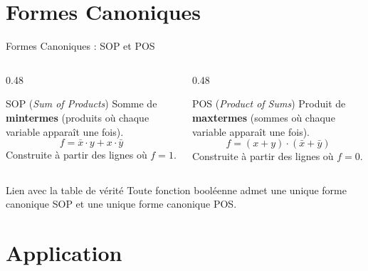 \section{Formes Canoniques}

\begin{frame}{Formes Canoniques : SOP et POS}

    \begin{columns}[T]
        \begin{column}{0.48\textwidth}
            \begin{block}{SOP (\textit{Sum of Products})}
                Somme de \textbf{mintermes} (produits où chaque variable apparaît une fois).
                \[
                    f = \bar{x} \cdot y + x \cdot \bar{y}
                \]
                Construite à partir des lignes où \(f = 1\).
            \end{block}
        \end{column}
        \begin{column}{0.48\textwidth}
            \begin{block}{POS (\textit{Product of Sums})}
                Produit de \textbf{maxtermes} (sommes où chaque variable apparaît une fois).
                \[
                    f = (x + y) \cdot (\bar{x} + \bar{y})
                \]
                Construite à partir des lignes où \(f = 0\).
            \end{block}
        \end{column}
    \end{columns}

    \vspace{0.5cm}

    \begin{exampleblock}{Lien avec la table de vérité}
        Toute fonction booléenne admet une unique forme canonique SOP et une unique forme canonique POS.
    \end{exampleblock}

\end{frame}

\section{Application}

